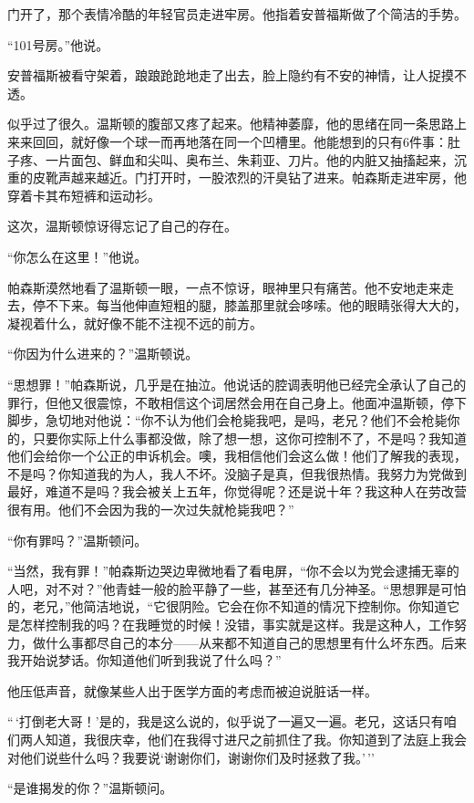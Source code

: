 门开了，那个表情冷酷的年轻官员走进牢房。他指着安普福斯做了个简洁的手势。

``101号房。''他说。

安普福斯被看守架着，踉踉跄跄地走了出去，脸上隐约有不安的神情，让人捉摸不透。

似乎过了很久。温斯顿的腹部又疼了起来。他精神萎靡，他的思绪在同一条思路上来来回回，就好像一个球一而再地落在同一个凹槽里。他能想到的只有6件事：肚子疼、一片面包、鲜血和尖叫、奥布兰、朱莉亚、刀片。他的内脏又抽搐起来，沉重的皮靴声越来越近。门打开时，一股浓烈的汗臭钻了进来。帕森斯走进牢房，他穿着卡其布短裤和运动衫。

这次，温斯顿惊讶得忘记了自己的存在。

``你怎么在这里！''他说。

帕森斯漠然地看了温斯顿一眼，一点不惊讶，眼神里只有痛苦。他不安地走来走去，停不下来。每当他伸直短粗的腿，膝盖那里就会哆嗦。他的眼睛张得大大的，凝视着什么，就好像不能不注视不远的前方。

``你因为什么进来的？''温斯顿说。

``思想罪！''帕森斯说，几乎是在抽泣。他说话的腔调表明他已经完全承认了自己的罪行，但他又很震惊，不敢相信这个词居然会用在自己身上。他面冲温斯顿，停下脚步，急切地对他说：``你不认为他们会枪毙我吧，是吗，老兄？他们不会枪毙你的，只要你实际上什么事都没做，除了想一想，这你可控制不了，不是吗？我知道他们会给你一个公正的申诉机会。噢，我相信他们会这么做！他们了解我的表现，不是吗？你知道我的为人，我人不坏。没脑子是真，但我很热情。我努力为党做到最好，难道不是吗？我会被关上五年，你觉得呢？还是说十年？我这种人在劳改营很有用。他们不会因为我的一次过失就枪毙我吧？''

``你有罪吗？''温斯顿问。

``当然，我有罪！''帕森斯边哭边卑微地看了看电屏，``你不会以为党会逮捕无辜的人吧，对不对？''他青蛙一般的脸平静了一些，甚至还有几分神圣。``思想罪是可怕的，老兄，''他简洁地说，``它很阴险。它会在你不知道的情况下控制你。你知道它是怎样控制我的吗？在我睡觉的时候！没错，事实就是这样。我是这种人，工作努力，做什么事都尽自己的本分——从来都不知道自己的思想里有什么坏东西。后来我开始说梦话。你知道他们听到我说了什么吗？''

他压低声音，就像某些人出于医学方面的考虑而被迫说脏话一样。

``\,`打倒老大哥！'是的，我是这么说的，似乎说了一遍又一遍。老兄，这话只有咱们两人知道，我很庆幸，他们在我得寸进尺之前抓住了我。你知道到了法庭上我会对他们说些什么吗？我要说`谢谢你们，谢谢你们及时拯救了我。'\,''

``是谁揭发的你？''温斯顿问。

